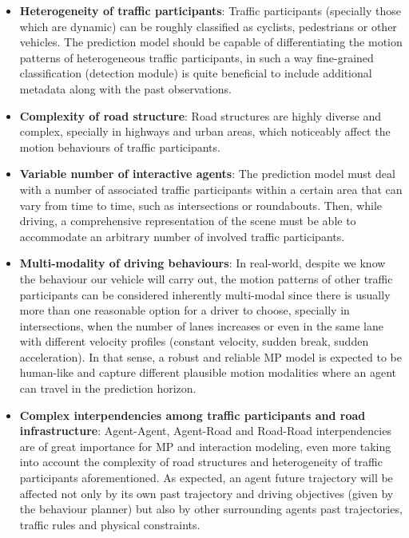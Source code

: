 \begin{itemize}
	
	\item \textbf{Heterogeneity of traffic participants}: Traffic participants (specially those which are dynamic) can be roughly classified as cyclists, pedestrians or other vehicles. The prediction model should be capable of differentiating the motion patterns of heterogeneous traffic participants, in such a way fine-grained classification (detection module) is quite beneficial to include additional metadata along with the past observations.
	
	\item \textbf{Complexity of road structure}: Road structures are highly diverse and complex, specially in highways and urban areas, which noticeably affect the motion behaviours of traffic participants.
	
	\item \textbf{Variable number of interactive agents}: The prediction model must deal with a number of associated traffic participants within a certain area that can vary from time to time, such as intersections or roundabouts. Then, while driving, a comprehensive representation of the scene must be able to accommodate an arbitrary number of involved traffic participants.
	
	\item \textbf{Multi-modality of driving behaviours}: In real-world, despite we know the behaviour our vehicle will carry out, the motion patterns of other traffic participants can be considered inherently multi-modal since there is usually more than one reasonable option for a driver to choose, specially in intersections, when the number of lanes increases or even in the same lane with different velocity profiles (constant velocity, sudden break, sudden acceleration). In that sense, a robust and reliable \ac{MP} model is expected to be human-like and capture different plausible motion modalities where an agent can travel in the prediction horizon.
	
	\item \textbf{Complex interpendencies among traffic participants and road infrastructure}: Agent-Agent, Agent-Road and Road-Road interpendencies are of great importance for \ac{MP} and interaction modeling, even more taking into account the complexity of road structures and heterogeneity of traffic participants aforementioned. As expected, an agent future trajectory will be affected not only by its own past trajectory and driving objectives (given by the behaviour planner) but also by other surrounding agents past trajectories, traffic rules and physical constraints.
	

\end{itemize}
